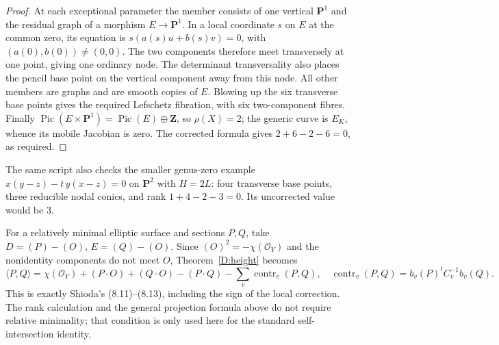 \begin{proof}
At each exceptional parameter the member consists of one vertical
$\mathbf P^1$ and the residual graph of a morphism $E\to\mathbf P^1$.
In a local coordinate $s$ on $E$ at the common zero, its equation is
$s(a(s)u+b(s)v)=0$, with $(a(0),b(0))\ne(0,0)$.  The two components
therefore meet transversely at one point, giving one ordinary node.
The determinant transversality also places the pencil base point on the
vertical component away from this node.  All other members are graphs
and are smooth copies of $E$.  Blowing up the six transverse base points
gives the required Lefschetz fibration, with six two-component fibres.
Finally $\operatorname{Pic}(E\times\mathbf P^1)=
\operatorname{Pic}(E)\oplus\mathbf Z$, so $\rho(X)=2$; the generic curve
is $E_K$, whence its mobile Jacobian is zero.  The corrected formula
gives $2+6-2-6=0$, as required.
\end{proof}

The same script also checks the smaller genus-zero example
$x(y-z)-t\,y(x-z)=0$ on $\mathbf P^2$ with $H=2L$:
four transverse base points, three reducible nodal conics, and rank
$1+4-2-3=0$.  Its uncorrected value would be $3$.

\begin{remark}
\label{D:elliptic}
For a relatively minimal elliptic surface and sections $P,Q$, take
$D=(P)-(O)$, $E=(Q)-(O)$.  Since $(O)^2=-\chi(\mathcal O_Y)$ and the
nonidentity components do not meet $O$, Theorem~\ref{D:height} becomes
\[
 \langle P,Q\rangle=\chi(\mathcal O_Y)+(P\cdot O)+(Q\cdot O)
       -(P\cdot Q)-\sum_v\operatorname{contr}_v(P,Q),
\quad
 \operatorname{contr}_v(P,Q)=b_v(P)^tC_v^{-1}b_v(Q).
\]
This is exactly Shioda's (8.11)--(8.13), including the sign of the local
correction.  The rank calculation and the general projection formula
above do not require relative minimality; that condition is only used
here for the standard self-intersection identity.
\end{remark}
